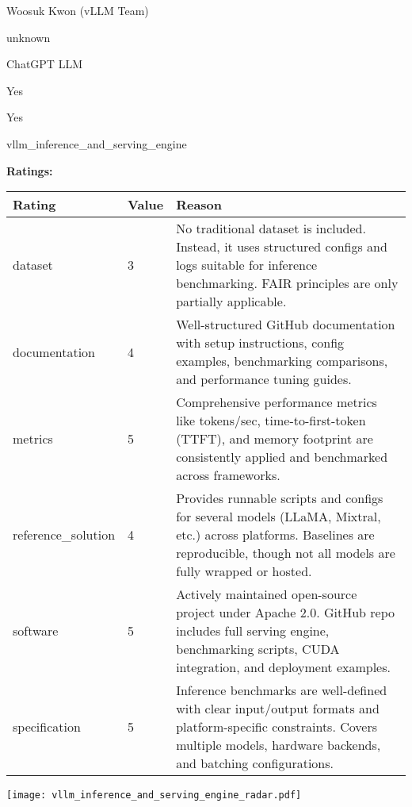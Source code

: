 {{\begin{description}[labelwidth=4cm, labelsep=1em, leftmargin=4cm, itemsep=0.1em, parsep=0em]
  \item[contact.name:] Woosuk Kwon (vLLM Team)
  \item[contact.email:] unknown
  \item[results.links.name:] ChatGPT LLM
  \item[fair.reproducible:] Yes
  \item[fair.benchmark\_ready:] Yes
  \item[id:] vllm\_inference\_and\_serving\_engine
  \item[Citations:] \cite{10.1145/3600006.3613165}
\end{description}

{\bf Ratings:} ~ \\

\begin{tabular}{p{} p{} p{}}
\hline
Rating & Value & Reason \\
\hline
dataset & 3 & No traditional dataset is included. Instead, it uses structured configs and logs suitable for inference benchmarking.
FAIR principles are only partially applicable.
 \\
documentation & 4 & Well-structured GitHub documentation with setup instructions, config examples, benchmarking comparisons,
and performance tuning guides.
 \\
metrics & 5 & Comprehensive performance metrics like tokens/sec, time-to-first-token (TTFT), and memory footprint
are consistently applied and benchmarked across frameworks.
 \\
reference\_solution & 4 & Provides runnable scripts and configs for several models (LLaMA, Mixtral, etc.) across platforms.
Baselines are reproducible, though not all models are fully wrapped or hosted.
 \\
software & 5 & Actively maintained open-source project under Apache 2.0. GitHub repo includes
full serving engine, benchmarking scripts, CUDA integration, and deployment examples.
 \\
specification & 5 & Inference benchmarks are well-defined with clear input/output formats and platform-specific constraints.
Covers multiple models, hardware backends, and batching configurations.
 \\
\hline
\end{tabular}

\texttt{[image: vllm\_inference\_and\_serving\_engine\_radar.pdf]}
}}
\clearpage